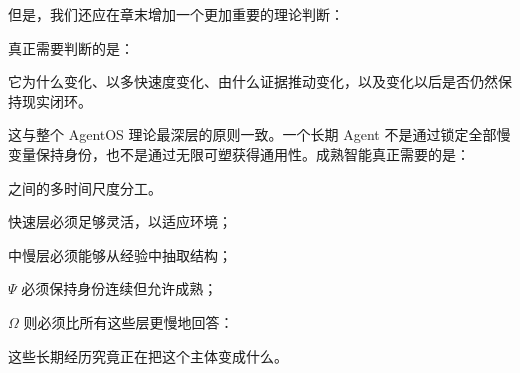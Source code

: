 \begin{statementbox}
\centering
{}
\end{statementbox}

但是，我们还应在章末增加一个更加重要的理论判断：

\begin{statementbox}
\centering
{}
\end{statementbox}

真正需要判断的是：

\begin{proposition*}
它为什么变化、以多快速度变化、由什么证据推动变化，以及变化以后是否仍然保持现实闭环。
\end{proposition*}

这与整个 AgentOS 理论最深层的原则一致。一个长期 Agent 不是通过锁定全部慢变量保持身份，也不是通过无限可塑获得通用性。成熟智能真正需要的是：

\begin{statementbox}
\centering
{}
\end{statementbox}

之间的多时间尺度分工。

快速层必须足够灵活，以适应环境；

中慢层必须能够从经验中抽取结构；

$\Psi$ 必须保持身份连续但允许成熟；

$\Omega$ 则必须比所有这些层更慢地回答：

\begin{statementbox}
这些长期经历究竟正在把这个主体变成什么。
\end{statementbox}


